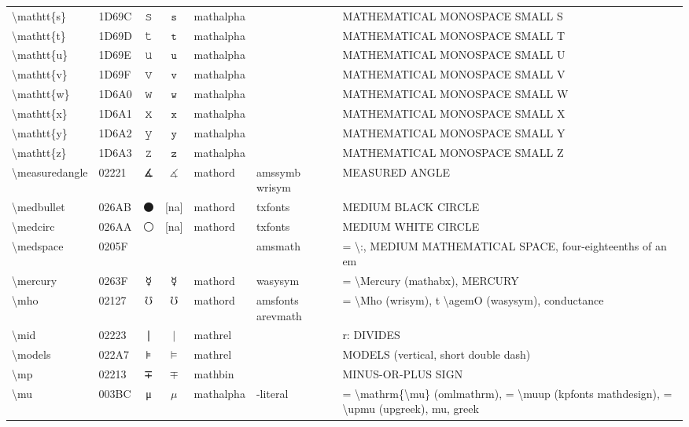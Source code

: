 \documentclass[a4paper,landscape]{article}
\begin{document}
\begin{longtable}{llcclll}
\textbackslash{}mathtt\{s\} & 1D69C & 𝚜 & $\mathtt{s}$ & mathalpha &  & MATHEMATICAL MONOSPACE SMALL S \\
\textbackslash{}mathtt\{t\} & 1D69D & 𝚝 & $\mathtt{t}$ & mathalpha &  & MATHEMATICAL MONOSPACE SMALL T \\
\textbackslash{}mathtt\{u\} & 1D69E & 𝚞 & $\mathtt{u}$ & mathalpha &  & MATHEMATICAL MONOSPACE SMALL U \\
\textbackslash{}mathtt\{v\} & 1D69F & 𝚟 & $\mathtt{v}$ & mathalpha &  & MATHEMATICAL MONOSPACE SMALL V \\
\textbackslash{}mathtt\{w\} & 1D6A0 & 𝚠 & $\mathtt{w}$ & mathalpha &  & MATHEMATICAL MONOSPACE SMALL W \\
\textbackslash{}mathtt\{x\} & 1D6A1 & 𝚡 & $\mathtt{x}$ & mathalpha &  & MATHEMATICAL MONOSPACE SMALL X \\
\textbackslash{}mathtt\{y\} & 1D6A2 & 𝚢 & $\mathtt{y}$ & mathalpha &  & MATHEMATICAL MONOSPACE SMALL Y \\
\textbackslash{}mathtt\{z\} & 1D6A3 & 𝚣 & $\mathtt{z}$ & mathalpha &  & MATHEMATICAL MONOSPACE SMALL Z \\
\textbackslash{}measuredangle & 02221 & ∡ & $\measuredangle$ & mathord & amssymb wrisym & MEASURED ANGLE \\
\textbackslash{}medbullet & 026AB & ⚫ & [na] & mathord & txfonts & MEDIUM BLACK CIRCLE \\
\textbackslash{}medcirc & 026AA & ⚪ & [na] & mathord & txfonts & MEDIUM WHITE CIRCLE \\
\textbackslash{}medspace & 0205F &   & $\medspace$ &  & amsmath & = \textbackslash{}:,  MEDIUM MATHEMATICAL SPACE,  four-eighteenths of an em \\
\textbackslash{}mercury & 0263F & \textsf ☿ & $\mercury$ & mathord & wasysym & = \textbackslash{}Mercury (mathabx), MERCURY \\
\textbackslash{}mho & 02127 & ℧ & $\mho$ & mathord & amsfonts arevmath & = \textbackslash{}Mho (wrisym), t \textbackslash{}agemO (wasysym), conductance \\
\textbackslash{}mid & 02223 & ∣ & $\mid$ & mathrel &  & r: DIVIDES \\
\textbackslash{}models & 022A7 & ⊧ & $\models$ & mathrel &  & MODELS (vertical, short double dash) \\
\textbackslash{}mp & 02213 & ∓ & $\mp$ & mathbin &  & MINUS-OR-PLUS SIGN \\
\textbackslash{}mu & 003BC & μ & $\mu$ & mathalpha & -literal & = \textbackslash{}mathrm\{\textbackslash{}mu\} (omlmathrm), = \textbackslash{}muup (kpfonts mathdesign), = \textbackslash{}upmu (upgreek), mu, greek \\

\end{longtable}
\end{document}
